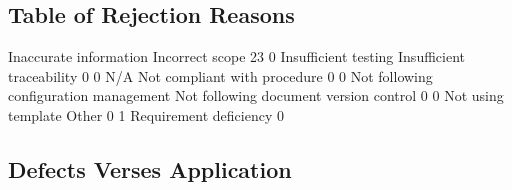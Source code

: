 \documentclass{article}
\begin{document}
\subsection{Table of Rejection Reasons}
\begin{Schunk}
\begin{Soutput}
                Inaccurate information                        Incorrect scope 
                                    23                                      0 
                  Insufficient testing              Insufficient traceability 
                                     0                                      0 
                                   N/A           Not compliant with procedure 
                                     0                                      0 
Not following configuration management Not following document version control 
                                     0                                      0 
                    Not using template                                  Other 
                                     0                                      1 
                Requirement deficiency 
                                     0 
\end{Soutput}
\end{Schunk}

\subsection{Defects Verses Application}
\end{document}
